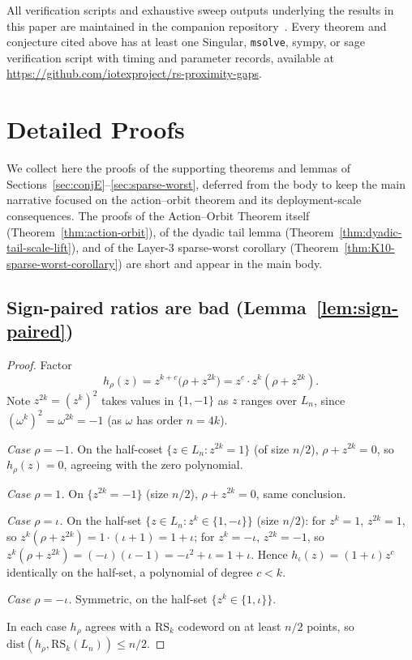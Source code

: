 \documentclass[11pt]{article}
\theoremstyle{definition}
\theoremstyle{remark}
\newcommand{\RS}{\mathrm{RS}}
\newcommand{\dist}{\mathrm{dist}}
\begin{document}
All verification scripts and exhaustive sweep outputs underlying the
results in this paper are maintained in the companion
repository~\cite{CompanionRepo}. Every theorem and conjecture cited
above has at least one Singular, \texttt{msolve}, sympy, or sage
verification script with timing and parameter records, available at
\url{https://github.com/iotexproject/rs-proximity-gaps}.

\section{Detailed Proofs}
\label{app:proofs}

We collect here the proofs of the supporting theorems and lemmas of
Sections~\ref{sec:conjE}--\ref{sec:sparse-worst}, deferred from the body
to keep the main narrative focused on the action--orbit theorem and its
deployment-scale consequences. The proofs of the Action--Orbit Theorem
itself (Theorem~\ref{thm:action-orbit}), of the dyadic tail lemma
(Theorem~\ref{thm:dyadic-tail-scale-lift}), and of the Layer-3 sparse-worst
corollary (Theorem~\ref{thm:K10-sparse-worst-corollary}) are short and
appear in the main body.

\subsection{Sign-paired ratios are bad (Lemma~\ref{lem:sign-paired})}
\label{prf:lem:sign-paired}

\begin{proof}
Factor
\[
 h_\rho(z) = z^{k+c}\bigl(\rho + z^{2k}\bigr) = z^c \cdot z^k(\rho + z^{2k}).
\]
Note $z^{2k} = (z^k)^2$ takes values in $\{1, -1\}$ as $z$ ranges over
$L_n$, since $(\omega^k)^2 = \omega^{2k} = -1$ (as $\omega$ has order $n =
4k$).

\noindent\emph{Case $\rho = -1$.} On the half-coset $\{z \in L_n : z^{2k} = 1\}$
(of size $n/2$), $\rho + z^{2k} = 0$, so $h_\rho(z) = 0$, agreeing with the
zero polynomial.

\noindent\emph{Case $\rho = 1$.} On $\{z^{2k} = -1\}$ (size $n/2$),
$\rho + z^{2k} = 0$, same conclusion.

\noindent\emph{Case $\rho = \iota$.} On the half-set
$\{z \in L_n : z^k \in \{1, -\iota\}\}$ (size $n/2$): for $z^k = 1$,
$z^{2k} = 1$, so $z^k(\rho + z^{2k}) = 1 \cdot (\iota + 1) = 1 + \iota$;
for $z^k = -\iota$, $z^{2k} = -1$, so $z^k(\rho + z^{2k}) = (-\iota)(\iota
- 1) = -\iota^2 + \iota = 1 + \iota$. Hence $h_\iota(z) = (1 + \iota) z^c$
identically on the half-set, a polynomial of degree $c < k$.

\noindent\emph{Case $\rho = -\iota$.} Symmetric, on the half-set $\{z^k \in
\{1, \iota\}\}$.

In each case $h_\rho$ agrees with a $\RS_k$ codeword on at least $n/2$
points, so $\dist(h_\rho, \RS_k(L_n)) \leq n/2$.
\end{proof}
\end{document}
